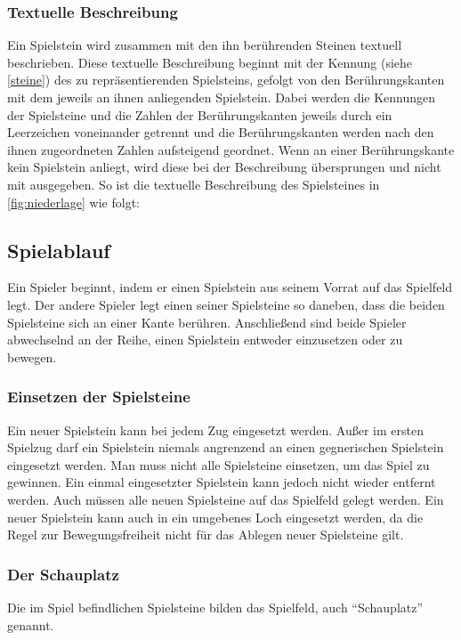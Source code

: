 \documentclass[ngerman, gray]{sdqassignment}
\begin{document}
\subsubsection{Textuelle Beschreibung}
\label{textuell}
Ein Spielstein wird zusammen mit den ihn berührenden Steinen textuell beschrieben. Diese textuelle Beschreibung beginnt mit der Kennung (siehe \cref{steine}) des zu repräsentierenden Spielsteins, gefolgt von den Berührungskanten mit dem jeweils an ihnen anliegenden Spielstein. Dabei werden die Kennungen der Spielsteine und die Zahlen der Berührungskanten jeweils durch ein Leerzeichen voneinander getrennt und die Berührungskanten werden nach den ihnen zugeordneten Zahlen aufsteigend geordnet. Wenn an einer Berührungskante kein Spielstein anliegt, wird diese bei der Beschreibung übersprungen und nicht mit ausgegeben. So ist die textuelle Beschreibung des Spielsteines  in \cref{fig:niederlage} wie folgt: 

\subsection{Spielablauf}
\label{ablauf}
Ein Spieler beginnt, indem er einen Spielstein aus seinem Vorrat auf das Spielfeld legt. Der andere Spieler legt einen seiner Spielsteine so daneben, dass die beiden Spielsteine sich an einer Kante berühren. Anschließend sind beide Spieler abwechselnd an der Reihe, einen Spielstein entweder einzusetzen oder zu bewegen.

\subsubsection{Einsetzen der Spielsteine}
Ein neuer Spielstein kann bei jedem Zug eingesetzt werden. Außer im ersten Spielzug darf ein Spielstein niemals angrenzend an einen gegnerischen Spielstein eingesetzt werden. Man muss nicht alle Spielsteine einsetzen, um das Spiel zu gewinnen. Ein einmal eingesetzter Spielstein kann jedoch nicht wieder entfernt werden. Auch müssen alle neuen Spielsteine auf das Spielfeld gelegt werden. Ein neuer Spielstein kann auch in ein umgebenes Loch eingesetzt werden, da die Regel zur Bewegungsfreiheit nicht für das Ablegen neuer Spielsteine gilt.

\subsubsection{Der Schauplatz}
Die im Spiel befindlichen Spielsteine bilden das Spielfeld, auch \enquote{Schauplatz} genannt.
\end{document}
